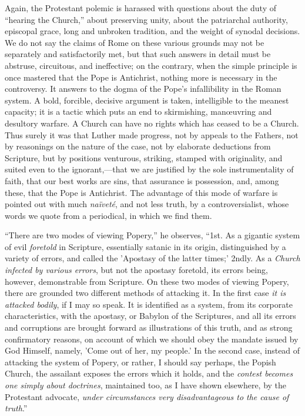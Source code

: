 Again, the Protestant polemic is harassed with questions about the
duty of ``hearing the Church,'' about preserving unity, about
the patriarchal authority, episcopal grace, long and unbroken
tradition, and the weight of synodal decisions. We do not say the
claims of Rome on these various grounds may not be separately and
satisfactorily met, but that such answers in detail must be abstruse,
circuitous, and ineffective; on the contrary, when the simple
principle is once mastered that the Pope is Antichrist, nothing more
is necessary in the controversy. It answers to the dogma of the Pope's
infallibility in the Roman system. A bold, forcible, decisive argument
is taken, intelligible to the meanest capacity; it is a tactic which
puts an end to skirmishing, manœuvring and desultory warfare. A
Church can have no rights which has ceased to be a Church. Thus surely
it was that Luther made progress, not by appeals to the Fathers, not
by reasonings on the nature of the case, not by elaborate
deductions from Scripture, but by positions venturous, striking,
stamped with originality, and suited even to the ignorant,—that we
are justified by the sole instrumentality of faith, that our best
works are sins, that assurance is possession, and, among these, that
the Pope is Antichrist. The advantage of this mode of warfare is
pointed out with much \emph{naïveté}, and not less truth, by a
controversialist, whose words we quote from a periodical, in which we
find them.

``There are two modes of viewing Popery,'' he observes,
``1st. As a gigantic system of evil \emph{foretold} in Scripture,
essentially satanic in its origin, distinguished by a variety of
errors, and called the 'Apostasy of the latter times;' 2ndly. As a \emph{Church
infected by various errors}, but not the apostasy foretold, its
errors being, however, demonstrable from Scripture. On these two modes
of viewing Popery, there are grounded two different methods of
attacking it. In the first case \emph{it is attacked bodily}, if I may
so speak. It is identified as a system, from its corporate
characteristics, with the apostasy, or Babylon of the Scriptures, and
all its errors and corruptions are brought forward as illustrations of
this truth, and as strong confirmatory reasons, on account of which we
should obey the mandate issued by God Himself, namely, 'Come out of
her, my people.' In the second case, instead of attacking the system
of Popery, or rather, I should say perhaps, the Popish Church, the
assailant exposes the errors which it holds, and the \emph{contest
becomes one simply about doctrines}, maintained too, as I have
shown elsewhere, by the Protestant advocate, \emph{under circumstances
very disadvantageous to the cause of truth}.''


